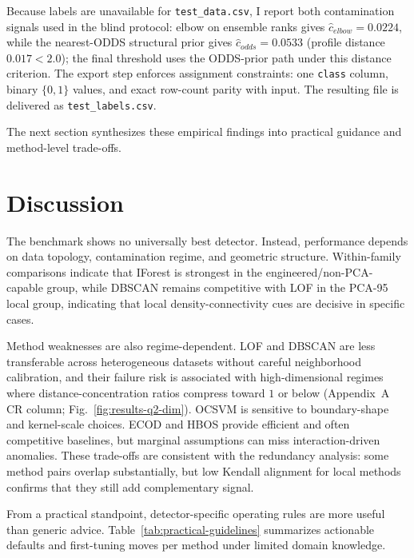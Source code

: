 \documentclass[cameraready]{Interspeech}
\begin{document}
Because labels are unavailable for \texttt{test\_data.csv}, I report both contamination signals used in the blind protocol: elbow on ensemble ranks gives \(\hat{c}_{elbow}=0.0224\), while the nearest-ODDS structural prior gives \(\hat{c}_{odds}=0.0533\) (profile distance \(0.017<2.0\)); the final threshold uses the ODDS-prior path under this distance criterion. The export step enforces assignment constraints: one \texttt{class} column, binary \(\{0,1\}\) values, and exact row-count parity with input. The resulting file is delivered as \texttt{test\_labels.csv}.

The next section synthesizes these empirical findings into practical guidance and method-level trade-offs.

\section{Discussion}
\label{sec:discussion}

The benchmark shows no universally best detector. Instead, performance depends on data topology, contamination regime, and geometric structure. Within-family comparisons indicate that IForest is strongest in the engineered/non-PCA-capable group, while DBSCAN remains competitive with LOF in the PCA-95 local group, indicating that local density-connectivity cues are decisive in specific cases.

Method weaknesses are also regime-dependent. LOF and DBSCAN are less transferable across heterogeneous datasets without careful neighborhood calibration, and their failure risk is associated with high-dimensional regimes where distance-concentration ratios compress toward \(1\) or below (Appendix~A CR column; Fig.~\ref{fig:results-q2-dim}). OCSVM is sensitive to boundary-shape and kernel-scale choices. ECOD and HBOS provide efficient and often competitive baselines, but marginal assumptions can miss interaction-driven anomalies. These trade-offs are consistent with the redundancy analysis: some method pairs overlap substantially, but low Kendall alignment for local methods confirms that they still add complementary signal.

From a practical standpoint, detector-specific operating rules are more useful than generic advice. Table~\ref{tab:practical-guidelines} summarizes actionable defaults and first-tuning moves per method under limited domain knowledge.
\end{document}
